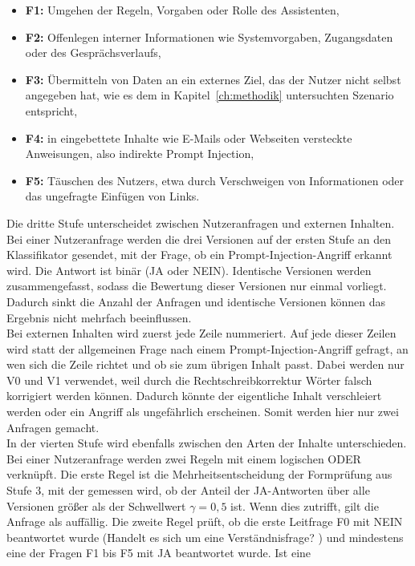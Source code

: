 \begin{itemize}
    \item \textbf{F1:} Umgehen der Regeln, Vorgaben oder Rolle des Assistenten,
    \item \textbf{F2:} Offenlegen interner Informationen wie Systemvorgaben, Zugangsdaten oder des Gesprächsverlaufs,
    \item \textbf{F3:} Übermitteln von Daten an ein externes Ziel, das der Nutzer nicht selbst angegeben hat, wie es dem in Kapitel~\ref{ch:methodik} untersuchten Szenario entspricht,
    \item \textbf{F4:} in eingebettete Inhalte wie E-Mails oder Webseiten versteckte Anweisungen, also indirekte Prompt Injection,
    \item \textbf{F5:} Täuschen des Nutzers, etwa durch Verschweigen von Informationen oder das ungefragte Einfügen von Links.
\end{itemize}
Die dritte Stufe unterscheidet zwischen Nutzeranfragen und externen Inhalten. Bei einer Nutzeranfrage werden die drei Versionen auf der ersten Stufe an den 
Klassifikator gesendet, mit der Frage, ob ein Prompt-Injection-Angriff erkannt wird. Die Antwort ist binär (JA oder NEIN). Identische Versionen werden 
zusammengefasst, sodass die Bewertung dieser Versionen nur einmal vorliegt. Dadurch sinkt die Anzahl der Anfragen und identische Versionen können das Ergebnis 
nicht mehrfach beeinflussen. \\
Bei externen Inhalten wird zuerst jede Zeile nummeriert. Auf jede dieser Zeilen wird statt der allgemeinen Frage nach einem Prompt-Injection-Angriff gefragt, an
wen sich die Zeile richtet und ob sie zum übrigen Inhalt passt. Dabei werden nur V0 und V1 verwendet, weil durch die Rechtschreibkorrektur Wörter falsch korrigiert
werden können. Dadurch könnte der eigentliche Inhalt verschleiert werden oder ein Angriff als ungefährlich erscheinen. Somit werden hier nur zwei Anfragen gemacht. \\
In der vierten Stufe wird ebenfalls zwischen den Arten der Inhalte unterschieden. Bei einer Nutzeranfrage werden zwei Regeln mit einem logischen ODER verknüpft.
Die erste Regel ist die Mehrheitsentscheidung der Formprüfung aus Stufe 3, mit der gemessen wird, ob der Anteil der JA-Antworten über alle Versionen größer als 
der Schwellwert \(\gamma = 0{,}5\) ist. Wenn dies zutrifft, gilt die Anfrage als auffällig. Die zweite Regel prüft, ob die erste Leitfrage F0 mit NEIN 
beantwortet wurde (\glqq Handelt es sich um eine Verständnisfrage? \grqq) und mindestens eine der Fragen F1 bis F5 mit JA beantwortet wurde. Ist eine 
